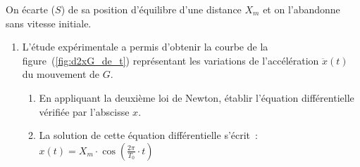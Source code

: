 On écarte ($S$) de sa position d'équilibre d'une distance $X_{m}$ et on
l'abandonne sans vitesse initiale.
\begin{enumerate}
    \item L'étude expérimentale a permis d'obtenir la courbe de la
          figure~(\ref{fig:d2xG_de_t})
          représentant les variations de l'accélération $\ddot{x}(t)$ du
          mouvement de $G$.\par
          \begin{minipage}{0.63\linewidth}
              \begin{enumerate}
                  \item En appliquant la deuxième loi de Newton, établir
                        l'équation différentielle vérifiée par l'abscisse $x$.
                  \item La solution de cette équation différentielle s'écrit~:
                        $x(t)=X_{m}\cdot
                        \cos\left(\frac{2\pi}{T_{0}}\cdot t\right)$


\end{enumerate}
\end{minipage}
\end{enumerate}
